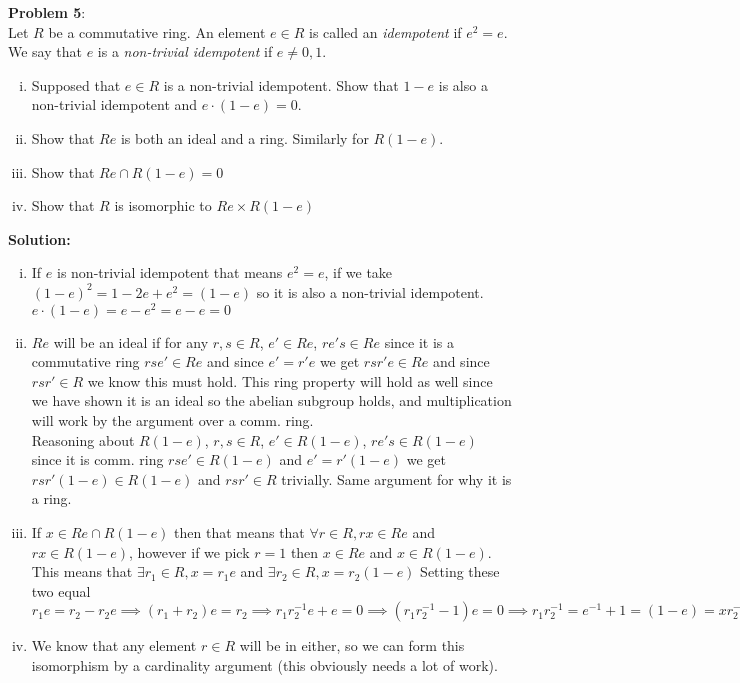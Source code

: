 \documentclass[11pt]{article}
\newcommand{\prob}[3]{\begin{flushleft}
        \textbf{Problem #1}: \\
        #2 
		\textbf{Solution:} 
		#3

\end{flushleft}}
\begin{document}
\prob{5}{
    Let $R$ be a commutative ring. An element $e \in R$ is called an \emph{idempotent} if $e^2 = e$. We say that $e$ is a \emph{non-trivial idempotent} if $e \neq 0,1$.
    \begin{enumerate}[(i)]
        \item Supposed that $e \in R$ is a non-trivial idempotent. Show that $1 - e$ is also a non-trivial idempotent and $e \cdot (1 - e) = 0$.
        \item Show that $Re$ is both an ideal and a ring. Similarly for $R(1-e)$.
        \item Show that $Re \cap R(1-e) = 0$
        \item Show that $R$ is isomorphic to $Re \times R(1-e)$
    \end{enumerate}
}{
    \begin{enumerate}[(i)]
        \item If $e$ is non-trivial idempotent that means $e^2 = e$, if we take $(1-e)^2 = 1 - 2e + e^2 = (1 - e)$ so it is also a non-trivial idempotent. \\
              $e\cdot(1-e) = e - e^2 = e - e = 0$

        \item $Re$ will be an ideal if for any $r, s \in R$, $e' \in Re$, $re's \in Re$ since it is a commutative ring $rse' \in Re$ and since $e' = r'e$ we get $rsr'e \in Re$ and since $rsr' \in R$ we know this must hold. This ring property will hold as well since we have shown it is an ideal so the abelian subgroup holds, and multiplication will work by the argument over a comm. ring. \\
              Reasoning about $R(1-e)$, $r, s \in R$, $e' \in R(1-e)$, $re's \in R(1-e)$ since it is comm. ring $rse' \in R(1-e)$ and $e' = r'(1-e)$ we get $rsr'(1-e) \in R(1-e)$ and $rsr' \in R$ trivially. Same argument for why it is a ring.

        \item If $x \in Re \cap R(1-e)$ then that means that $\forall r \in R, rx \in Re$ and $rx \in R(1-e)$, however if we pick $r = 1$ then $x \in Re$ and $x \in R(1-e)$. \\
              This means that $\exists r_1 \in R, x = r_1e$ and $\exists r_2 \in R, x = r_2(1-e)$
              Setting these two equal $r_1e = r_2 - r_2e \implies (r_1 + r_2)e = r_2 \implies
                  r_1r_2^{-1}e + e = 0 \implies (r_1r_2^{-1} - 1)e = 0 \implies r_1r_2^{-1} = e^{-1} + 1 = (1 - e) = xr_2^{-1} \implies x = r_1 = r_2 \implies x = 0$

        \item We know that any element $r \in R$ will be in either, so we can form this isomorphism by a cardinality argument (this obviously needs a lot of work).
    \end{enumerate}
}
\end{document}
